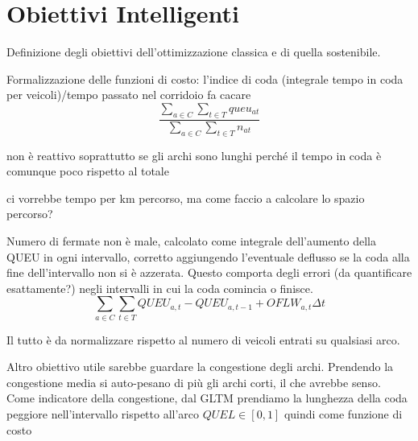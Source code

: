 \chapter{Obiettivi Intelligenti}
Definizione degli obiettivi dell'ottimizzazione classica e di quella sostenibile.

Formalizzazione delle funzioni di costo:
l'indice di coda (integrale tempo in coda per veicoli)/tempo passato nel corridoio fa cacare
$$
\frac{\sum_{a \in C} \sum_{t \in T}{queu_{at}}}{\sum_{a \in C} \sum_{t \in T}{n_{at}}}
$$

non è reattivo soprattutto se gli archi sono lunghi perché il tempo in coda è comunque poco rispetto al totale

ci vorrebbe tempo per km percorso, ma come faccio a calcolare lo spazio percorso?

Numero di fermate non è male, calcolato come integrale dell'aumento della QUEU in ogni intervallo, corretto aggiungendo l'eventuale deflusso se la coda alla fine dell'intervallo non si è azzerata.
Questo comporta degli errori (da quantificare esattamente?) negli intervalli in cui la coda comincia o finisce.
$$
\sum_{a \in C} \sum_{t \in T} QUEU_{a,t} - QUEU_{a,t-1} + OFLW_{a,t} \Delta t
$$


Il tutto è da normalizzare rispetto al numero di veicoli entrati su qualsiasi arco.

Altro obiettivo utile sarebbe guardare la congestione degli archi.
Prendendo la congestione media si auto-pesano di più gli archi corti, il che avrebbe senso.
Come indicatore della congestione, dal GLTM prendiamo la lunghezza della coda peggiore nell'intervallo rispetto all'arco $QUEL\in[0,1]$ quindi come funzione di costo
